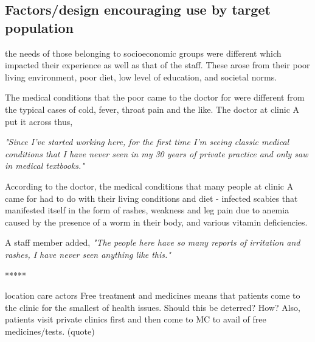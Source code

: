 




\subsection{Factors/design encouraging use by target population}

the needs of those belonging to socioeconomic groups were different which impacted their experience as well as that of the staff. These arose from their poor living environment, poor diet, low level of education, and societal norms.

The medical conditions that the poor came to the doctor for were different from the typical cases of cold, fever, throat pain and the like. The doctor at clinic A put it across thus,

\textit{"Since I've started working here, for the first time I'm seeing classic medical conditions that I have never seen in my 30 years of private practice and only saw in medical textbooks."}

According to the doctor, the medical conditions that many people at clinic A came for had to do with their living conditions and diet - infected scabies that manifested itself in the form of rashes, weakness and leg pain due to anemia caused by the presence of a worm in their body, and various vitamin deficiencies.

A staff member added,
\textit{"The people here have so many reports of irritation and rashes, I have never seen anything like this."}

*****

location
care
actors
Free treatment and medicines means that patients come to the clinic for the smallest of health issues. Should this be deterred? How? Also, patients visit private clinics first and then come to MC to avail of free medicines/tests. (quote)


